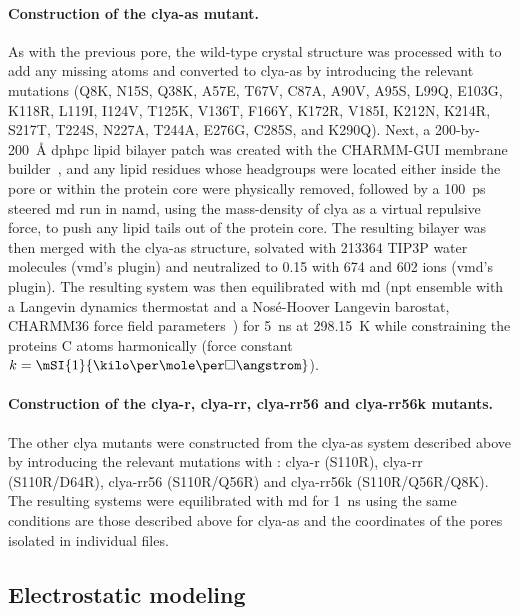 \paragraph{Construction of the \gls{clya-as} mutant.}
%
As with the previous pore, the wild-type crystal structure was processed with  to add any missing
atoms and converted to \gls{clya-as} by introducing the relevant mutations (Q8K, N15S, Q38K, A57E, T67V,
C87A, A90V, A95S, L99Q, E103G, K118R, L119I, I124V, T125K, V136T, F166Y, K172R, V185I, K212N, K214R, S217T,
T224S, N227A, T244A, E276G, C285S, and K290Q). Next, a 200-by-\SI{200}{\angstrom} \gls{dphpc} lipid bilayer
patch was created with the CHARMM-GUI membrane builder~\cite{Jo-2008,Lee-2015}, and any lipid residues whose
headgroups were located either inside the pore \lumen{} or within the protein core were physically removed, followed by
a \SI{100}{\ps} steered \gls{md} run in \gls{namd}, using the mass-density of \gls{clya} as a virtual
repulsive force, to push any lipid tails out of the protein core. The resulting bilayer was then merged with
the \gls{clya-as} structure, solvated with 213364 {TIP3P} water molecules (\gls{vmd}'s  plugin)
and neutralized to \SI{0.15}{\Molar} with 674  and 602  ions (\gls{vmd}'s 
plugin). The resulting system was then equilibrated with \gls{md} (\gls{npt} ensemble with a Langevin dynamics
thermostat and a Nos\'{e}-Hoover Langevin barostat, {CHARMM36} force field parameters~\cite{Best-2012}) for
\SI{5}{\ns} at \SI{298.15}{\kelvin} while constraining the proteins C\ta{} atoms harmonically (force constant
$k = \mSI{1}{\kilo\cal\per\mole\per\square\angstrom}$).

\paragraph{Construction of the \gls{clya-r}, \gls{clya-rr}, \gls{clya-rr56} and \gls{clya-rr56k} mutants.}
%
The other \gls{clya} mutants were constructed from the \gls{clya-as} system described above by introducing
the relevant mutations with : \gls{clya-r} (S110R), \gls{clya-rr} (S110R/D64R), \gls{clya-rr56}
(S110R/Q56R) and \gls{clya-rr56k} (S110R/Q56R/Q8K). The resulting systems were equilibrated with \gls{md} for
\SI{1}{\ns} using the same conditions are those described above for \gls{clya-as} and the coordinates of the
pores isolated in individual files.


\subsection{Electrostatic modeling}
%
\label{sec:elec:methods:elec}

